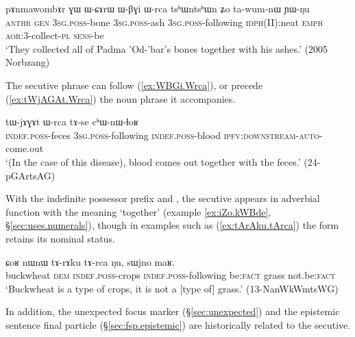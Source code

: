 \begin{exe}
\ex \label{ex:WBGi.Wrca}
 \gll  pɤnmawombɤr ɣɯ ɯ-ɕɤrɯ ɯ-βɣi ɯ-rca tsʰɯntsʰɯn ʑo ta-wum-nɯ ɲɯ-ŋu \\ 
\textsc{anthr} \textsc{gen} \textsc{3sg}.\textsc{poss}-bone \textsc{3sg}.\textsc{poss}-ash \textsc{3sg}.\textsc{poss}-following \textsc{idph}(II):neat \textsc{emph} \textsc{aor}:3\flobv{}-collect-\textsc{pl} \textsc{sens}-be  \\
\glt `They collected all of Padma 'Od-'bar's bones together with his ashes.' (2005 Norbzang)
\end{exe}

The secutive phrase can follow  (\ref{ex:WBGi.Wrca}), or precede (\ref{ex:tWjAGAt.Wrca}) the noun phrase it accompanies.

\begin{exe}
\ex \label{ex:tWjAGAt.Wrca}
 \gll   tɯ-jɤɣɤt ɯ-rca tɤ-se cʰɯ-nɯ-ɬoʁ \\
 \textsc{indef}.\textsc{poss}-feces \textsc{3sg}.\textsc{poss}-following \textsc{indef}.\textsc{poss}-blood \textsc{ipfv}:\textsc{downstream}-\textsc{auto}-come.out \\
 \glt `(In the case of this disease), blood comes out together with the feces.' (24-pGArtsAG) 	
 \end{exe}

With the indefinite possessor prefix  and  , the secutive appears in adverbial function with the meaning `together' (example \ref{ex:iZo.kWBde}, §\ref{sec:uses.numerals}), though in examples such as  (\ref{ex:tArAku.tArca}) the form   retains its nominal status.


\begin{exe}
\ex \label{ex:tArAku.tArca}
 \gll ɕoʁ nɯnɯ tɤ-rɤku tɤ-rca ŋu, sɯjno maʁ. \\
 buckwheat \textsc{dem} \textsc{indef}.\textsc{poss}-crops \textsc{indef}.\textsc{poss}-following be:\textsc{fact} grass not.be:\textsc{fact} \\
 \glt `Buckwheat is a type of crops, it is not a [type of] grass.' (13-NanWkWmtsWG) 
\end{exe}

In addition, the unexpected focus marker  (§\ref{sec:unexpected}) and the epistemic sentence final particle  (§\ref{sec:fsp.epistemic}) are historically related to the secutive.
 
